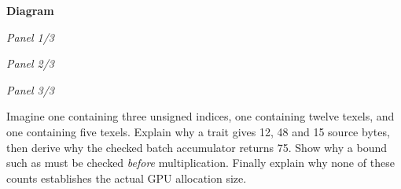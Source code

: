 \par\medskip\noindent\textbf{Diagram}\par
\par\noindent\textit{Panel 1/3}\par{}\par
\par\noindent\textit{Panel 2/3}\par{}\par
\par\noindent\textit{Panel 3/3}\par{}\par

Imagine one  containing three unsigned indices, one  containing twelve texels, and one  containing five texels. Explain why a trait gives 12, 48 and 15 source bytes, then derive why the checked batch accumulator returns 75. Show why a bound such as  must be checked \emph{before} multiplication. Finally explain why none of these counts establishes the actual GPU allocation size.

